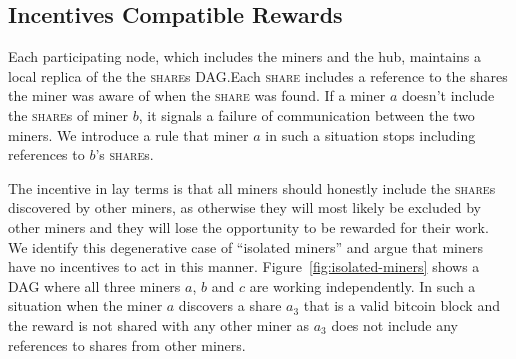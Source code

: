 \documentclass{article}
\begin{document}
  
  
\subsection{Incentives Compatible Rewards}\label{sec:rewards}

Each participating node, which includes the miners and the hub,
maintains a local replica of the the \textsc{share}s DAG.\@ Each
\textsc{share} includes a reference to the shares the miner was aware
of when the \textsc{share} was found. If a miner $a$ doesn't include
the \textsc{share}s of miner $b$, it signals a failure of
communication between the two miners. We introduce a rule that miner
$a$ in such a situation stops including references to $b$'s
\textsc{share}s.

The incentive in lay terms is that all miners should honestly include
the \textsc{share}s discovered by other miners, as otherwise they will
most likely be excluded by other miners and they will lose the
opportunity to be rewarded for their work. We identify this
degenerative case of ``isolated miners'' and argue that miners have no
incentives to act in this manner. Figure~\ref{fig:isolated-miners}
shows a DAG where all three miners $a$, $b$ and $c$ are working
independently. In such a situation when the miner $a$ discovers a
share $a_3$ that is a valid bitcoin block and the reward is not shared
with any other miner as $a_3$ does not include any references to
shares from other miners.
\end{document}
